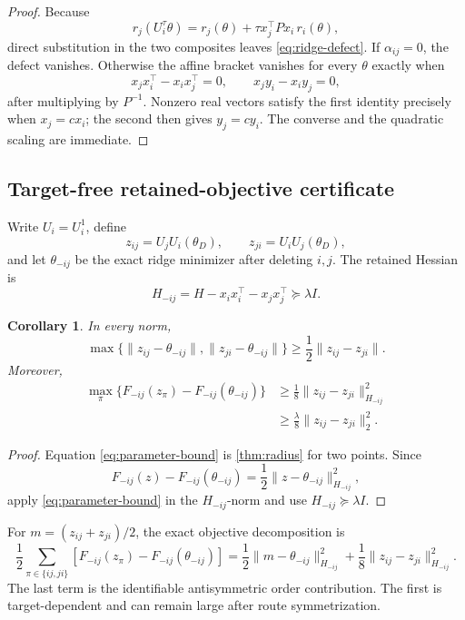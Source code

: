 \documentclass[10pt]{article}
\newtheorem{corollary}[theorem]{Corollary}
\theoremstyle{definition}
\theoremstyle{remark}
\begin{document}
\begin{proof}
Because
\[
r_j(U_i^\tau\theta)
=r_j(\theta)+\tau x_j^\top Px_i\,r_i(\theta),
\]
direct substitution in the two composites leaves \eqref{eq:ridge-defect}. If
\(\alpha_{ij}=0\), the defect vanishes. Otherwise the affine bracket vanishes
for every \(\theta\) exactly when
\[
x_jx_i^\top-x_ix_j^\top=0,
\qquad
x_jy_i-x_iy_j=0,
\]
after multiplying by \(P^{-1}\). Nonzero real vectors satisfy the first
identity precisely when \(x_j=cx_i\); the second then gives \(y_j=cy_i\).
The converse and the quadratic scaling are immediate.
\end{proof}

\subsection{Target-free retained-objective certificate}

Write \(U_i=U_i^1\), define
\[
z_{ij}=U_jU_i(\theta_D),
\qquad
z_{ji}=U_iU_j(\theta_D),
\]
and let \(\theta_{-ij}\) be the exact ridge minimizer after deleting \(i,j\).
The retained Hessian is
\[
H_{-ij}=H-x_ix_i^\top-x_jx_j^\top\succeq\lambda I.
\]

\begin{corollary}
\label{cor:objective}
In every norm,
\[
\max\{\|z_{ij}-\theta_{-ij}\|,\|z_{ji}-\theta_{-ij}\|\}
\ge \frac12\|z_{ij}-z_{ji}\|.
\tag{7.6}\label{eq:parameter-bound}
\]
Moreover,
\[
\begin{aligned}
\max_\pi\{
F_{-ij}(z_\pi)-F_{-ij}(\theta_{-ij})
\}
&\ge
\frac18\|z_{ij}-z_{ji}\|_{H_{-ij}}^2\\
&\ge
\frac\lambda8\|z_{ij}-z_{ji}\|_2^2.
\end{aligned}
\tag{7.7}
\]
\end{corollary}

\begin{proof}
Equation \eqref{eq:parameter-bound} is \cref{thm:radius} for two points. Since
\[
F_{-ij}(z)-F_{-ij}(\theta_{-ij})
=\frac12\|z-\theta_{-ij}\|_{H_{-ij}}^2,
\]
apply \eqref{eq:parameter-bound} in the \(H_{-ij}\)-norm and use
\(H_{-ij}\succeq\lambda I\).
\end{proof}

For \(m=(z_{ij}+z_{ji})/2\), the exact objective decomposition is
\[
\frac12\sum_{\pi\in\{ij,ji\}}
\left[
F_{-ij}(z_\pi)-F_{-ij}(\theta_{-ij})
\right]
=
\frac12\|m-\theta_{-ij}\|_{H_{-ij}}^2
+
\frac18\|z_{ij}-z_{ji}\|_{H_{-ij}}^2.
\tag{7.8}
\]
The last term is the identifiable antisymmetric order contribution. The first
is target-dependent and can remain large after route symmetrization.
\end{document}
